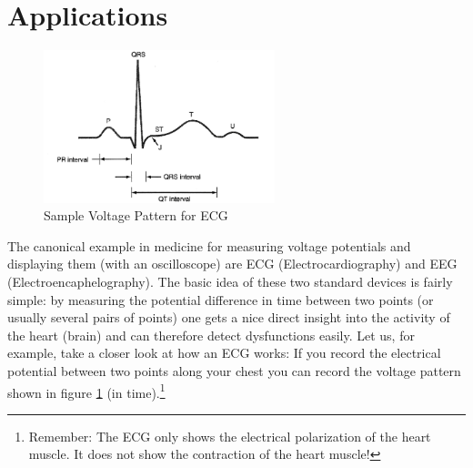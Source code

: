 \section{Applications}

\begin{figure}[h]
    \begin{center}
        \includegraphics[width=0.6\textwidth]{./Exp1/pic/image5.png}
    \end{center}
    \caption{Sample Voltage Pattern for ECG}
    \label{fig:ecgpattern}
\end{figure}

The canonical example in medicine for measuring voltage potentials and displaying them (with an oscilloscope) are ECG (Electrocardiography) and EEG (Electroencaphelography). The basic idea of these two standard devices is fairly simple: by measuring the potential difference in time between two points (or usually several pairs of points) one gets a nice direct insight into the activity of the heart (brain) and can therefore detect dysfunctions easily. Let us, for example, take a closer look at how an ECG works: If you record the electrical potential between two points along your chest you can record the voltage pattern shown in figure \ref{fig:ecgpattern} (in time).\footnote{Remember: The ECG only shows the electrical polarization of the heart muscle. It does not show the contraction of the heart muscle!} \myskip

